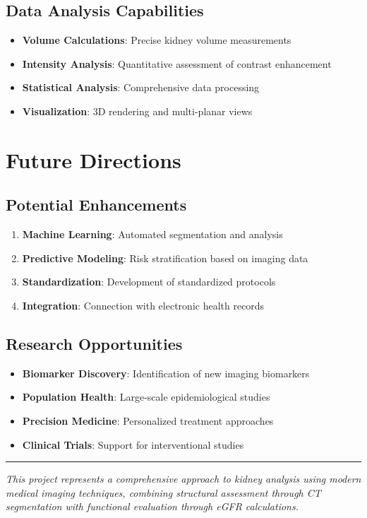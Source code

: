 \documentclass{article}
\begin{document}
\subsection{Data Analysis Capabilities}
\begin{itemize}
    \item \textbf{Volume Calculations}: Precise kidney volume measurements
    \item \textbf{Intensity Analysis}: Quantitative assessment of contrast enhancement
    \item \textbf{Statistical Analysis}: Comprehensive data processing
    \item \textbf{Visualization}: 3D rendering and multi-planar views
\end{itemize}

\section{Future Directions}

\subsection{Potential Enhancements}
\begin{enumerate}
    \item \textbf{Machine Learning}: Automated segmentation and analysis
    \item \textbf{Predictive Modeling}: Risk stratification based on imaging data
    \item \textbf{Standardization}: Development of standardized protocols
    \item \textbf{Integration}: Connection with electronic health records
\end{enumerate}

\subsection{Research Opportunities}
\begin{itemize}
    \item \textbf{Biomarker Discovery}: Identification of new imaging biomarkers
    \item \textbf{Population Health}: Large-scale epidemiological studies
    \item \textbf{Precision Medicine}: Personalized treatment approaches
    \item \textbf{Clinical Trials}: Support for interventional studies
\end{itemize}

\bigskip
\hrule
\bigskip

\textit{This project represents a comprehensive approach to kidney analysis using modern medical imaging techniques, combining structural assessment through CT segmentation with functional evaluation through eGFR calculations.}
\end{document}
